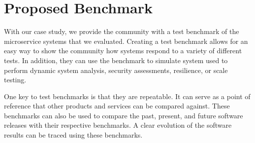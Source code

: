 

\section{Proposed Benchmark}
\label{sec:proposed}


With our case study, we provide the community with a test benchmark of the microservice systems that we evaluated. Creating a test benchmark allows for an easy way to show the community how systems respond to a variety of different tests. In addition, they can use the benchmark to simulate system used to perform dynamic system analysis, security assessments, resilience, or scale testing.

One key to test benchmarks is that they are repeatable. It can serve as a point of reference that other products and services can be compared against. These benchmarks can also be used to compare the past, present, and future software releases with their respective benchmarks. A clear evolution of the software results can be traced using these benchmarks.



